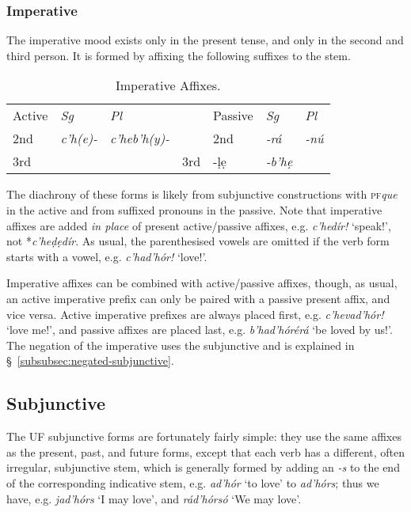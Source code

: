 \documentclass[a4paper, 12pt, twoside, final]{article}
\def\pfabbr{{\normalfont\scshape pf\space}}
\def\pf#1{\pfabbr\textit{#1}}
\let \nf \normalfont
\let \w \textit
\begin{document}
\subsubsection{Imperative}
The imperative mood exists only in the present tense, and only in the second and third person. It is formed by
affixing the following suffixes to the stem.
\begin{table}[H]
\centering
\noindent\begin{tabular}{l|>{\it}l|>{\it}lll|>{\it}l|>{\it}l}
 Active&\nf Sg&\nf Pl& & Passive&\nf Sg&\nf Pl\\\cline{1-3}\cline{5-7}
2nd &c’h(e)-     &c’heb’h(y)- &&2nd& -rá   &-nú\\\cline{1-3}\cline{5-7}
3rd &\multicolumn{2}{c}{\it c’hel(ẹ)-} &&3rd& -ḷẹ   &-b’hẹ\\
\end{tabular}
\caption{Imperative Affixes.}\label{tab:imperative-affixes}
\end{table}

\noindent The diachrony of these forms is likely from subjunctive constructions with \pf{que} in the active
and from suffixed pronouns in the passive. Note that imperative affixes are added \textit{in place} of
present active/passive affixes, e.g. \w{c’hedír!} ‘speak!’, not *\w{c’heḍẹdír}. As usual, the parenthesised
vowels are omitted if the verb form starts with a vowel, e.g. \w{c’had’hór!} ‘love!’.

Imperative affixes can be combined with active/passive affixes, though, as usual, an active imperative prefix
can only be paired with a passive present affix, and vice versa. Active imperative prefixes are always placed
first, e.g. \w{c’hevad’hór!} ‘love me!’, and passive affixes are placed last, e.g. \w{b’had’hórérá} ‘be loved by
us!’. The negation of the imperative uses the subjunctive and is explained in §~\ref{subsubsec:negated-subjunctive}.

\subsection{Subjunctive}\label{subsec:subjunctive}
The UF subjunctive forms are fortunately fairly simple: they use the same affixes as the present, past, and future
forms, except that each verb has a different, often irregular, subjunctive stem, which is generally formed
by adding an \w{-s} to the end of the corresponding indicative stem, e.g. \w{ad’hór} ‘to love’ to \w{ad’hórs};
thus we have, e.g. \w{jad’hórs} ‘I may love’, and \w{rád’hórsó} ‘We may love’.
\end{document}
